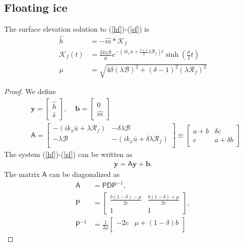 \documentclass[paper=a4, fontsize=11pt]{article}
\begin{document}
\subsection*{Floating ice}
The surface elevation solution to (\ref{hf})-(\ref{sf}) is
\begin{align}
\hat{h} &= -\hat{m} * \mathcal{K}_f \\
\mathcal{K}_f(t)  &= \frac{2\delta\lambda\mathcal{B}}{\mu} e^{-\left(ik_x\bar{u}+\frac{\delta+1}{2}\lambda\mathcal{R}_f\right)t}\sinh\left({\frac{\mu}{2}t}\right)    \\
\mu &= \sqrt{4\delta(\lambda\mathcal{B})^2 + (\delta-1)^2(\lambda\mathcal{R}_f)^2 }
\end{align}
\begin{proof}
We define
\begin{align}
&\pmb{y} = \begin{bmatrix}
\hat{h} \\
\hat{s}
\end{bmatrix}, \;\;\;\;
\pmb{b} =
\begin{bmatrix}
0\\
\hat{m}
\end{bmatrix}\\
&\mathsf{A} = \begin{bmatrix}
-(ik_x \bar{u}  + \lambda \mathcal{R}_f) & -\delta\lambda\mathcal{B} \\
-\lambda\mathcal{B} & -(ik_x \bar{u}  + \delta\lambda\mathcal{R}_f) \\
\end{bmatrix} \equiv
\begin{bmatrix}
a+b & \delta c \\
c & a+\delta b
\end{bmatrix}
\end{align}
The system (\ref{hf})-(\ref{sf}) can be written as
\begin{align}
\dot{\pmb{y}} = \mathsf{A}\pmb{y} + \pmb{b}.
\end{align}
The matrix $\mathsf{A}$ can be diagonalized as
\begin{align}
\mathsf{A} &= \mathsf{P}\mathsf{D}\mathsf{P}^{-1},\\
\mathsf{P} &= \begin{bmatrix}
\frac{b(1-\delta)-\mu}{2c} & \frac{b(1-\delta)+\mu}{2c} \\
1 & 1
\end{bmatrix},\\
\mathsf{P}^{-1} &= \frac{1}{2\mu}\begin{bmatrix}
-2c &  \mu+(1-\delta)b \\

\end{bmatrix}
\end{align}
\end{proof}
\end{document}

